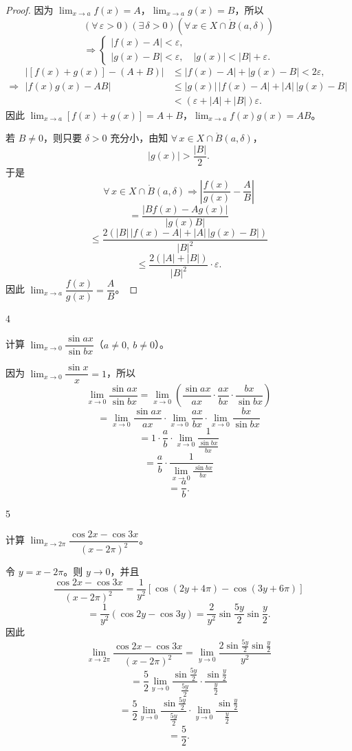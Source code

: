 \begin{proof}
	因为 \(\lim_{x\to a}f(x)=A\)，\(\lim_{x\to a}g(x)=B\)，所以
	\[
	(\forall\,\varepsilon>0)(\exists\,\delta>0)(\forall\,x\in X\cap\mathring{B}(a,\delta))
	\]
	\[
	\Longrightarrow \begin{cases} |f(x)-A|<\varepsilon, \\ |g(x)-B|<\varepsilon,\quad |g(x)|<|B|+\varepsilon. \end{cases}
	\]
	\[
	\Longrightarrow
	\begin{aligned}
	|[f(x)+g(x)]-(A+B)| &\le |f(x)-A|+|g(x)-B|<2\varepsilon,\\
	|f(x)g(x)-AB| &\le |g(x)|\,|f(x)-A|+|A|\,|g(x)-B|\\
	&<(\varepsilon+|A|+|B|)\varepsilon.
	\end{aligned}
	\]
	因此 \(\lim_{x\to a}[f(x)+g(x)]=A+B\)，\(\lim_{x\to a}f(x)g(x)=AB\)。

	若 \(B\neq0\)，则只要 \(\delta>0\) 充分小，由知 \(\forall\,x\in X\cap\mathring{B}(a,\delta)\)，
	\[
	|g(x)|>\frac{|B|}2.
	\]
	于是
	\[
	\forall\,x\in X\cap\mathring{B}(a,\delta)\Longrightarrow \left|\frac{f(x)}{g(x)}-\frac AB\right|
	\]
	\[
	=\frac{|Bf(x)-Ag(x)|}{|g(x)B|}
	\]
	\[
	\le\frac{2(|B|\,|f(x)-A|+|A|\,|g(x)-B|)}{|B|^2}
	\]
	\[
	\le\frac{2(|A|+|B|)}{|B|^2}\cdot\varepsilon.
	\]
	因此 \(\lim_{x\to a}\dfrac{f(x)}{g(x)}=\dfrac AB\)。
\end{proof}

\begin{sourceexample}{4}

	计算 \(\lim_{x\to0}\dfrac{\sin ax}{\sin bx}\)（\(a\neq0,\ b\neq0\)）。

	因为 \(\lim_{x\to0}\dfrac{\sin x}{x}=1\)，所以
	\[
	\lim_{x\to0}\frac{\sin ax}{\sin bx}
	=\lim_{x\to0}\left(\frac{\sin ax}{ax}\cdot\frac{ax}{bx}\cdot\frac{bx}{\sin bx}\right)
	\]
	\[
	=\lim_{x\to0}\frac{\sin ax}{ax}\cdot\lim_{x\to0}\frac{ax}{bx}\cdot\lim_{x\to0}\frac{bx}{\sin bx}
	\]
	\[
	=1\cdot\frac ab\cdot\lim_{x\to0}\frac{1}{\frac{\sin bx}{bx}}
	\]
	\[
	=\frac ab\cdot\frac1{\lim_{x\to0}\frac{\sin bx}{bx}}
	\]
	\[
	=\frac ab.
	\]

\end{sourceexample}

\begin{sourceexample}{5}

	计算 \(\lim_{x\to2\pi}\dfrac{\cos2x-\cos3x}{(x-2\pi)^2}\)。

	令 \(y=x-2\pi\)。则 \(y\to0\)，并且
	\[
	\frac{\cos2x-\cos3x}{(x-2\pi)^2}=\frac1{y^2}[\cos(2y+4\pi)-\cos(3y+6\pi)]
	\]
	\[
	=\frac1{y^2}(\cos2y-\cos3y)=\frac2{y^2}\sin\frac{5y}2\sin\frac y2.
	\]
	因此
	\[
	\lim_{x\to2\pi}\frac{\cos2x-\cos3x}{(x-2\pi)^2}=\lim_{y\to0}\frac{2\sin\frac{5y}2\sin\frac y2}{y^2}
	\]
	\[
	=\frac52\lim_{y\to0}\frac{\sin\frac{5y}2}{\frac{5y}2}\cdot\frac{\sin\frac y2}{\frac y2}
	\]
	\[
	=\frac52\lim_{y\to0}\frac{\sin\frac{5y}2}{\frac{5y}2}\cdot\lim_{y\to0}\frac{\sin\frac y2}{\frac y2}
	\]
	\[
	=\frac52.
	\]

\end{sourceexample}

